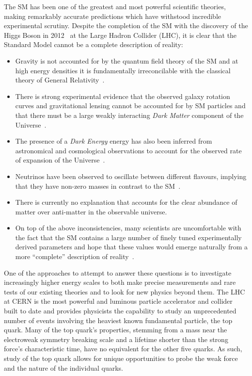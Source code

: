 The SM has been one of the greatest and most powerful scientific theories, making remarkably accurate predictions which have withstood incredible experimental scrutiny.
Despite the completion of the SM with the discovery of the Higgs Boson in 2012~\cite{HiggsCMS,HiggsATLAS} at the Large Hadron Collider (LHC), it is clear that the Standard Model cannot be a complete description of reality:
\begin{itemize}
\item Gravity is not accounted for by the quantum field theory of the SM and at high energy densities it is fundamentally irreconcilable with the classical theory of General Relativity~\cite{}.
\item There is strong experimental evidence that the observed galaxy rotation curves and gravitational lensing cannot be accounted for by SM particles and that there must be a large weakly interacting \emph{Dark Matter} component of the Universe~\cite{Bertone:2004pz}.
\item The presence of a \emph{Dark Energy} energy has also been inferred from astronomical and cosmological observations to account for the observed rate of expansion of the Universe~\cite{Peebles:2002gy}.
\item Neutrinos have been observed to oscillate between different flavours, implying that they have non-zero masses in contrast to the SM~\cite{Fukuda:1998mi,Ahmad:2001an}.
\item There is currently no explanation that accounts for the clear abundance of matter over anti-matter in the observable universe.
\item On top of the above inconsistencies, many scientists are uncomfortable with the fact that the SM contains a large number of finely tuned experimentally derived parameters and hope that these values would emerge naturally from a more ``complete'' description of reality~\cite{Burdman:2007ck
}.
\end{itemize}

One of the approaches to attempt to answer these questions is to investigate increasingly higher energy scales to both make precise measurements and rare tests of our existing theories and to look for new physics beyond them.
The LHC at CERN is the most powerful and luminous particle accelerator and collider built to date and provides physicists the capability to study an unprecedented number of events involving the heaviest known fundamental particle, the top quark.
Many of the top quark's properties, stemming from a mass near the electroweak symmetry breaking scale and a lifetime shorter than the strong force’s characteristic time, have no equivalent for the other five quarks.
As such, study of the top quark allows for unique opportunities to probe the weak force and the nature of the individual quarks.

